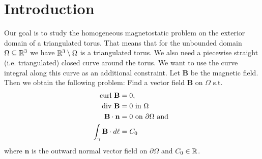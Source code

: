 \documentclass[../master_thesis.tex]{subfiles}
\begin{document}
\section{Introduction}
Our goal is to study the homogeneous magnetostatic problem on the exterior 
domain of a triangulated torus. That means 
that for the unbounded domain  $\Omega \subseteq \mathbb{R}^3$ we have
$\mathbb{R}^3 \setminus \Omega$ is a triangulated torus. We also need a 
piecewise straight (i.e. triangulated) closed curve around the torus.
We want to use the curve integral along this curve as an additional 
constraint.
Let $\mathbf{B}$ be the magnetic field. Then we obtain the following problem:
Find a vector field $\mathbf{B}$ on $\Omega$ s.t.
\begin{align}
    \operatorname{curl} \, \mathbf{B} &= 0, \\ 
    \operatorname{div} \, \mathbf{B}  &= 0 \text{ in } \Omega \\
    \mathbf{B} \cdot \mathbf{n} &= 0 \text{ on } \partial \Omega \text{ and }\\
    \int_\gamma \mathbf{B} \cdot d\ell &= C_0
\end{align}
where $\mathbf{n}$ is the outward normal vector field on $\partial \Omega$ and 
$C_0 \in \mathbb{R}$. 
\end{document}
